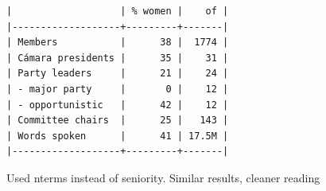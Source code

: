 \documentclass[letter,12pt]{article}
\begin{document}


  


  \begin{footnotesize}
    \begin{verbatim}
|                   | % women |    of |
|-------------------+---------+-------|
| Members           |      38 |  1774 |
| Cámara presidents |      35 |    31 |
| Party leaders     |      21 |    24 |
| - major party     |       0 |    12 |
| - opportunistic   |      42 |    12 |
| Committee chairs  |      25 |   143 |
| Words spoken      |      41 | 17.5M |
|-------------------+---------+-------|
    \end{verbatim}
  \end{footnotesize}

  

Used nterms instead of seniority. Similar results, cleaner reading
  
\end{document}
